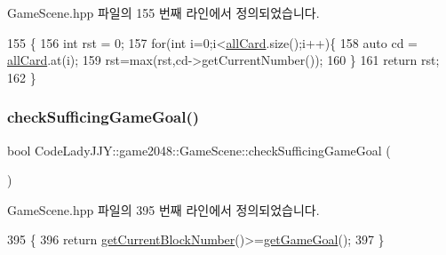 Game\+Scene.\+hpp 파일의 155 번째 라인에서 정의되었습니다.


\begin{DoxyCode}
155                         \{
156         \textcolor{keywordtype}{int} rst = 0;
157         \textcolor{keywordflow}{for}(\textcolor{keywordtype}{int} i=0;i<\hyperlink{class_code_lady_j_j_y_1_1game2048_1_1_game_scene_aadcd54235c70f1d794213f50f429437f}{allCard}.size();i++)\{
158                 \textcolor{keyword}{auto} cd = \hyperlink{class_code_lady_j_j_y_1_1game2048_1_1_game_scene_aadcd54235c70f1d794213f50f429437f}{allCard}.at(i);
159                 rst=max(rst,cd->getCurrentNumber());
160         \}
161         \textcolor{keywordflow}{return} rst;
162     \}
\end{DoxyCode}
\mbox{\label{class_code_lady_j_j_y_1_1game2048_1_1_game_scene_a9e9ea53a4ff493d0aafc2197c3bae12c}} 
\subsubsection{\texorpdfstring{check\+Sufficing\+Game\+Goal()}{checkSufficingGameGoal()}}
{\footnotesize\ttfamily bool Code\+Lady\+J\+J\+Y\+::game2048\+::\+Game\+Scene\+::check\+Sufficing\+Game\+Goal (\begin{DoxyParamCaption}{ }\end{DoxyParamCaption})\hspace{0.3cm}{\ttfamily [inline]}}



Game\+Scene.\+hpp 파일의 395 번째 라인에서 정의되었습니다.


\begin{DoxyCode}
395                                  \{
396         \textcolor{keywordflow}{return} \hyperlink{class_code_lady_j_j_y_1_1game2048_1_1_game_scene_a102fddfdf3e911218583dbc375786402}{getCurrentBlockNumber}()>=\hyperlink{class_code_lady_j_j_y_1_1game2048_1_1_game_scene_a91a4b92af4105f3a0e60b58b96ec0cb5}{getGameGoal}();
397     \}
\end{DoxyCode}
\mbox{\label{class_code_lady_j_j_y_1_1game2048_1_1_game_scene_ae4a2a6b84c48c11a1be2339b59720b5e}} 
